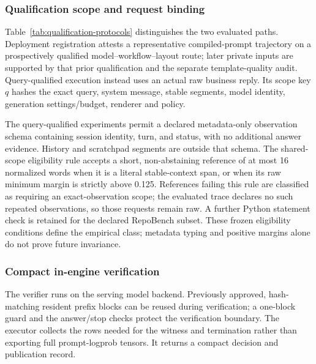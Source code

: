 \subsubsection{Qualification scope and request binding}
Table~\ref{tab:qualification-protocols} distinguishes the two evaluated paths. Deployment registration attests a representative compiled-prompt trajectory on a prospectively qualified model--workflow--layout route; later private inputs are supported by that prior qualification and the separate template-quality audit. Query-qualified execution instead uses an actual raw business reply. Its scope key $q$ hashes the exact query, system message, stable segments, model identity, generation settings/budget, renderer and policy.



The query-qualified experiments permit a declared metadata-only observation schema containing session identity, turn, and status, with no additional answer evidence. History and scratchpad segments are outside that schema. The shared-scope eligibility rule accepts a short, non-abstaining reference of at most 16 normalized words when it is a literal stable-context span, or when its raw minimum margin is strictly above 0.125. References failing this rule are classified as requiring an exact-observation scope; the evaluated trace declares no such repeated observations, so those requests remain raw. A further Python statement check is retained for the declared RepoBench subset. These frozen eligibility conditions define the empirical class; metadata typing and positive margins alone do not prove future invariance.

\subsubsection{Compact in-engine verification}
The verifier runs on the serving model backend. Previously approved, hash-matching resident prefix blocks can be reused during verification; a one-block guard and the answer/stop checks protect the verification boundary. The executor collects the rows needed for the witness and termination rather than exporting full prompt-logprob tensors. It returns a compact decision and publication record.

